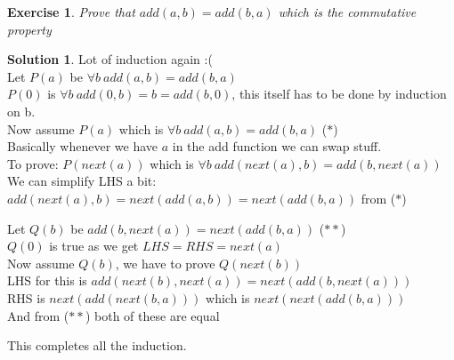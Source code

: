 \documentclass[a4paper,10pt]{article}
\newtheorem{exercise}{Exercise}[section]
\theoremstyle{definition} %
\newtheorem*{solution}{Solution}
\begin{document}
    \begin{exercise}
        Prove that $add(a,b) = add(b,a)$ which is the commutative property
    \end{exercise}
    \begin{solution}
        Lot of induction again :( \\
        Let $P(a)$ be $\forall b \ add(a,b) = add(b,a)$ \\
        $P(0)$ is $\forall b \ add(0,b) = b = add(b,0)$, this itself has to be done by induction on b. \\
        Now assume $P(a)$ which is $\forall b \ add(a,b) = add(b,a)$ \quad ($\ast$) \\
        Basically whenever we have $a$ in the add function we can swap stuff. \\
        To prove: $P(next(a))$ which is $\forall b \ add(next(a),b) = add(b,next(a))$ \\
        We can simplify LHS a bit: $add(next(a),b) = next(add(a,b)) = next(add(b,a))$ from ($\ast$)
        \begin{adjustwidth}{1cm}{0cm}
            Let $Q(b)$ be $add(b, next(a)) = next(add(b,a))$ \quad ($\ast\ast$) \\
            $Q(0)$ is true as we get $LHS = RHS = next(a)$ \\
            Now assume $Q(b)$, we have to prove $Q(next(b))$ \\
            LHS for this is $add(next(b), next(a)) = next(add(b, next(a)))$ \\
            RHS is $next(add(next(b,a)))$ which is $next(next(add(b,a)))$ \\
            And from ($\ast\ast$) both of these are equal
        \end{adjustwidth}
        This completes all the induction.
    \end{solution}
\end{document}
